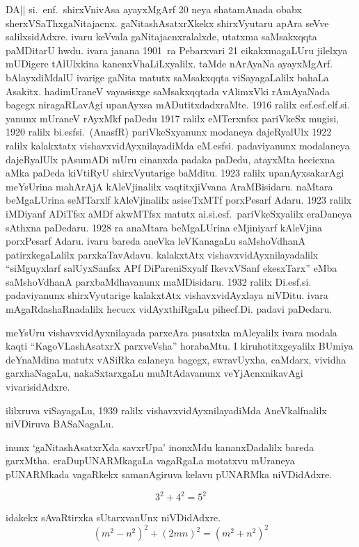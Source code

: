 DA|| si.~enf.~shirxVnivAsa ayayxMgArf {\rm 20} neya shatamAnada obabx sherxVSaThxgaNitajacnx. gaNitashAsatxrXkekx shirxVyutaru apAra seVve salilxsidAdxre. ivaru keVvala gaNitajacnxralalxde, utatxma saMsakxqqta paMDitarU hwdu. ivara janana {\rm 1901}~ra Pebarxvari {\rm 21} cikakxmagaLUru jilelxya mUDigere tAlUlxkina kanenxVhaLiLxyalilx. taMde nArAyaNa ayayxMgArf. bAlayxdiMdalU ivarige gaNita matutx saMsakxqqta viSayagaLalilx bahaLa Asakitx. hadimUraneV vayasisxge saMsakxqqtada vAlimxVki rAmAyaNada bagegx niragaRLavAgi upanAyxsa mADutitxdadxraMte. {\rm 1916} ralilx esf.esf.elf.si. yanunx mUraneV rAyxMkf paDedu {\rm 1917} ralilx eMTerxnfsx pariVkeSx mugisi, {\rm 1920} ralilx bi.esfsi.~(AnasfR) pariVkeSxyanunx modaneya dajeRyalUlx {\rm 1922} ralilx kalakxtatx vishavxvidAyxnilayadiMda eM.esfsi. padaviyanunx modalaneya dajeRyalUlx pAsumADi mUru cinanxda padaka paDedu, atayxMta hecicxna aMka paDeda kiVtiRyU shirxVyutarige baMditu. {\rm 1923} ralilx upanAyxsakarAgi meYsUrina mahArAjA kAleVjinalilx vaqtitxjiVvana AraMBisidaru. naMtara beMgaLUrina seMTarxlf kAleVjinalilx asiseTxMTf porxPesarf Adaru. {\rm 1923} ralilx iMDiyanf ADiTfsx aMDf akwMTfsx matutx ai.si.esf.~pariVkeSxyalilx eraDaneya sAthxna paDedaru. {\rm 1928} ra anaMtara beMgaLUrina eMjiniyarf kAleVjina porxPesarf Adaru. ivaru bareda aneVka leVKanagaLu saMshoVdhanA patirxkegaLalilx parxkaTavAdavu. kalakxtAtx vishavxvidAyxnilayadalilx ``siMguyxlarf salUyxSanfsx APf DiPareniSxyalf IkevxVSanf ekesxTarx'' eMba saMshoVdhanA parxbaMdhavanunx maMDisidaru. {\rm 1932} ralilx Di.esf.si. padaviyanunx shirxVyutarige kalakxtAtx vishavxvidAyxlaya niVDitu. ivara mAgaRdashaRnadalilx hecucx vidAyxthiRgaLu pihecf.Di. padavi paDedaru.
 \vskip 0.2cm

meYsUru vishavxvidAyxnilayada parxcAra pusatxka mAleyalilx ivara modala kaqti ``KagoVLashAsatxrX parxveVsha'' horabaMtu. I kiruhotitxgeyalilx BUmiya deYnaM\-dina matutx vASiRka calaneya bagegx, swravUyxha, caMdarx, vividha garxhaNagaLu, nakaSxtarxgaLu muMtAdavanunx veYjAcnxnikavAgi vivarisidAdxre.

ililxruva viSayagaLu, {\rm 1939} ralilx vishavxvidAyxnilayadiMda AneVkalfnalilx niVDiruva BASaNagaLu.

inunx `gaNitashAsatxrXda savxrUpa' inonxMdu kananxDadalilx bareda garxMtha. eraDu\break pUNARMkagaLa vagaRgaLa motatxvu mUraneya pUNARMkada vagaRkekx samanAgiruva kelavu pUNARMka niVDidAdxre.

$$3^2+4^2=5^2$$

idakekx sAvaRtirxka sUtarxvanUnx niVDidAdxre.
$$
(m^2-n^2)^2+(2mn)^2=(m^2+n^2)^2
$$

